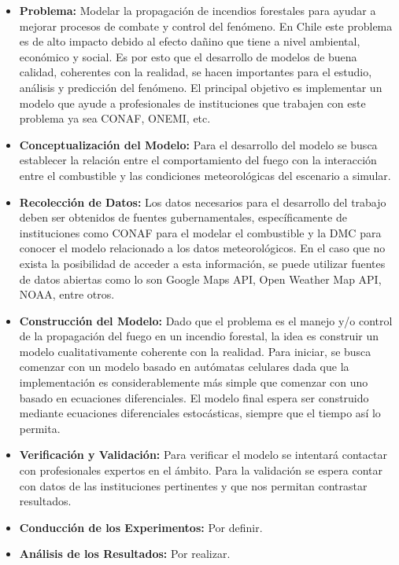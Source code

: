 \documentclass[12pt]{article}
\begin{document}
\begin{enumerate}
        \begin{itemize}
          \item \textbf{Problema:} Modelar la propagación de incendios forestales para ayudar a mejorar 
            procesos de combate y control del fenómeno. En Chile este problema es de alto impacto debido al 
            efecto dañino que tiene a nivel ambiental, económico y social. Es por esto que el desarrollo de 
            modelos de buena calidad, coherentes con la realidad, se hacen importantes para el estudio, análisis 
            y predicción del fenómeno. El principal objetivo es implementar un modelo que ayude a profesionales 
            de instituciones que trabajen con este problema ya sea CONAF, ONEMI, etc.
          \item \textbf{Conceptualización del Modelo:} Para el desarrollo del modelo se busca establecer la 
            relación entre el comportamiento del fuego con la interacción entre el combustible y las condiciones
            meteorológicas del escenario a simular.
          \item \textbf{Recolección de Datos:} Los datos necesarios para el desarrollo del trabajo deben ser 
            obtenidos de fuentes gubernamentales, específicamente de instituciones como CONAF para el modelar
            el combustible y la DMC para conocer el modelo relacionado a los datos meteorológicos. En el caso
            que no exista la posibilidad de acceder a esta información, se puede utilizar fuentes de datos abiertas
            como lo son Google Maps API, Open Weather Map API, NOAA, entre otros.
          \item \textbf{Construcción del Modelo:} Dado que el problema es el manejo y/o control de la 
            propagación del fuego en un incendio forestal, la idea es construir un modelo cualitativamente 
            coherente con la realidad. Para iniciar, se busca comenzar con un modelo basado en autómatas 
            celulares dada que la implementación es considerablemente más simple que comenzar con uno basado
            en ecuaciones diferenciales. El modelo final espera ser construido mediante ecuaciones diferenciales
            estocásticas, siempre que el tiempo así lo permita.
          \item \textbf{Verificación y Validación:} Para verificar el modelo se intentará contactar con profesionales
            expertos en el ámbito. Para la validación se espera contar con datos de las instituciones pertinentes
            y que nos permitan contrastar resultados.
          \item \textbf{Conducción de los Experimentos:} Por definir.
          \item \textbf{Análisis de los Resultados:} Por realizar.
        \end{itemize}

    \end{enumerate}
        
\end{document}
